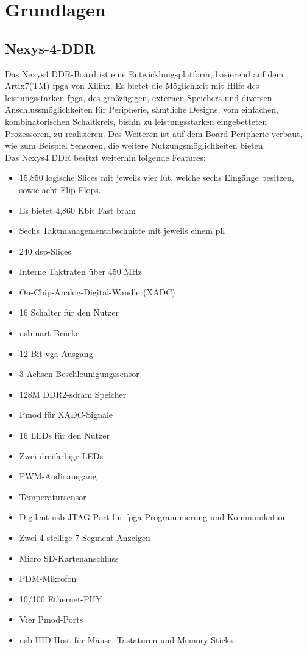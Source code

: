 \chapter{Grundlagen}\label{kap:grundlagen}


\section{Nexys-4-DDR}\label{kap:nexys4}
Das Nexys4 DDR-Board ist eine Entwicklungsplatform, basierend auf dem Artix7(TM)-\ac{fpga}
von Xilinx. Es bietet die Möglichkeit mit Hilfe des leistungsstarken \ac{fpga}, des großzügigen, externen Speichers und diversen Anschlussmöglichkeiten
für Peripherie, sämtliche Designs, vom einfachen, kombinatorischen Schaltkreis, bishin zu leistungsstarken eingebetteten Prozessoren, zu realisieren.
Des Weiteren ist auf dem Board Peripherie verbaut, wie zum Beispiel Sensoren, die weitere Nutzungsmöglichkeiten bieten.\\
Das Nexys4 DDR besitzt weiterhin folgende Features:~\cite{digilent}\\
\begin{itemize}
  \item 15,850 logische Slices mit jeweils vier \ac{lut}, welche sechs Eingänge besitzen, sowie acht Flip-Flops.
  \item Es bietet 4,860 Kbit Fast \ac{bram}
  \item Sechs Taktmanagementabschnitte mit jeweils einem \ac{pll}
  \item 240 \ac{dsp}-Slices
  \item Interne Taktraten über 450 MHz
  \item On-Chip-Analog-Digital-Wandler(XADC)
  \item 16 Schalter für den Nutzer
  \item \ac{usb}-\ac{uart}-Brücke
  \item 12-Bit \ac{vga}-Ausgang
  \item 3-Achsen Beschleunigungssensor
  \item 128M DDR2-\ac{sdram} Speicher
  \item Pmod für XADC-Signale
  \item 16 LEDs für den Nutzer
  \item Zwei dreifarbige LEDs
  \item PWM-Audioausgang
  \item Temperatursensor
  \item Digilent \ac{usb}-JTAG Port für \ac{fpga} Programmierung und Kommunikation
  \item Zwei 4-stellige 7-Segment-Anzeigen
  \item Micro SD-Kartenanschluss
  \item PDM-Mikrofon
  \item 10/100 Ethernet-PHY
  \item Vier Pmod-Ports
  \item \ac{usb} HID Host für Mäuse, Tastaturen und Memory Sticks
\end{itemize}



